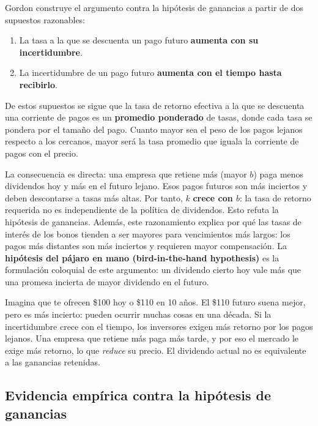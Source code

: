 \documentclass[12pt]{article}
\begin{document}
Gordon construye el argumento contra la hip\'otesis de ganancias a partir de dos supuestos razonables:
\begin{enumerate}
  \item La tasa a la que se descuenta un pago futuro \textbf{aumenta con su incertidumbre}.
  \item La incertidumbre de un pago futuro \textbf{aumenta con el tiempo hasta recibirlo}.
\end{enumerate}

De estos supuestos se sigue que la tasa de retorno efectiva a la que se descuenta una corriente de pagos es un \textbf{promedio ponderado} de tasas, donde cada tasa se pondera por el tama\~no del pago. Cuanto mayor sea el peso de los pagos lejanos respecto a los cercanos, mayor ser\'a la tasa promedio que iguala la corriente de pagos con el precio.

\begin{explicacion}
La consecuencia es directa: una empresa que retiene m\'as (mayor $b$) paga menos dividendos hoy y m\'as en el futuro lejano. Esos pagos futuros son m\'as inciertos y deben descontarse a tasas m\'as altas. Por tanto, $k$ \textbf{crece con $b$}: la tasa de retorno requerida no es independiente de la pol\'itica de dividendos. Esto refuta la hip\'otesis de ganancias. Adem\'as, este razonamiento explica por qu\'e las tasas de inter\'es de los bonos tienden a ser mayores para vencimientos m\'as largos: los pagos m\'as distantes son m\'as inciertos y requieren mayor compensaci\'on. La \textbf{hip\'otesis del p\'ajaro en mano (bird-in-the-hand hypothesis)} es la formulaci\'on coloquial de este argumento: un dividendo cierto hoy vale m\'as que una promesa incierta de mayor dividendo en el futuro.
\end{explicacion}

\begin{intuicion}
Imagina que te ofrecen \$100 hoy o \$110 en 10 a\~nos. El \$110 futuro suena mejor, pero es m\'as incierto: pueden ocurrir muchas cosas en una d\'ecada. Si la incertidumbre crece con el tiempo, los inversores exigen m\'as retorno por los pagos lejanos. Una empresa que retiene m\'as paga m\'as tarde, y por eso el mercado le exige m\'as retorno, lo que \textit{reduce} su precio. El dividendo actual no es equivalente a las ganancias retenidas.
\end{intuicion}

\subsection{Evidencia emp\'irica contra la hip\'otesis de ganancias}
\end{document}

